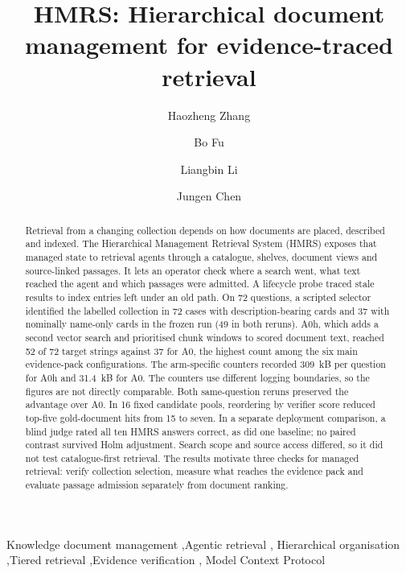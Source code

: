 \documentclass[review,12pt]{elsarticle}
\begin{document}
\begin{frontmatter}

\title{HMRS: Hierarchical document management for evidence-traced retrieval}

\author[inst1]{Haozheng Zhang}
\author[inst2]{Bo Fu}
\author[inst2]{Liangbin Li}
\author[inst1]{Jungen Chen}

\begin{abstract}
Retrieval from a changing collection depends on how documents are placed,
described and indexed. The Hierarchical Management Retrieval System (HMRS)
exposes that managed state to retrieval agents through a catalogue, shelves,
document views and source-linked passages. It lets an operator
check where a search went, what text reached the agent and which passages
were admitted. A lifecycle probe traced stale results to
index entries left under an old path. On 72 questions, a scripted
selector identified the labelled collection in
72 cases with description-bearing cards and 37 with nominally name-only
cards in the frozen run (49 in both reruns). A0h, which adds a second vector
search and prioritised chunk windows to scored document text, reached 52 of
72 target strings against 37 for A0, the highest count among the six main
evidence-pack configurations. The arm-specific counters recorded 309~kB per question for A0h
and 31.4~kB for A0. The counters use different logging
boundaries, so the figures are not directly comparable. Both same-question reruns preserved
the advantage over A0. In 16 fixed candidate pools,
reordering by verifier score reduced top-five gold-document hits from 15
to seven. In a separate deployment comparison, a blind judge
rated all ten HMRS answers correct, as did one baseline; no paired contrast
survived Holm adjustment. Search scope and source access differed, so it
did not test catalogue-first retrieval. The
results motivate three checks for managed
retrieval: verify collection selection, measure what reaches the evidence
pack and evaluate passage admission separately from document ranking.
\end{abstract}

\begin{keyword}
Knowledge document management \sep Agentic retrieval \sep
Hierarchical organisation \sep Tiered retrieval \sep Evidence verification \sep
Model Context Protocol
\end{keyword}

\end{frontmatter}
\end{document}
